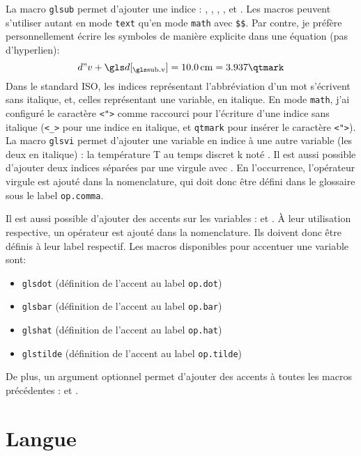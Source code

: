 \documentclass[PhD,nohyperref,english,french]{ulthese}
\begin{document}
La macro \texttt{glsub} permet d'ajouter une indice : , , , ,  et . Les macros peuvent s'utiliser autant en mode \texttt{text} qu'en mode \texttt{math} avec \texttt{\$\$}. Par contre, je préfère personnellement écrire les symboles de manière explicite dans une équation (pas d'hyperlien):
\begin{equation}
d"v + \glsub{d}{v} = \SI{10.0}{\centi\meter} = 3.937\qtmark
\end{equation}
Dans le standard ISO, les indices représentant l'abbréviation d'un mot s'écrivent sans italique, et, celles représentant une variable, en italique. En mode \texttt{math}, j'ai configuré le caractère \texttt{<">} comme raccourci pour l'écriture d'une indice sans italique (\texttt{<\_>} pour une indice en italique, et \texttt{qtmark} pour insérer le caractère \texttt{<">}). La macro \texttt{glsvi} permet d'ajouter une variable en indice à une autre variable (les deux en italique) : la température \gls{T} au temps discret \gls{k} noté . Il est aussi possible d'ajouter deux indices séparées par une virgule avec . En l’occurrence, l'opérateur virgule est ajouté dans la nomenclature, qui doit donc être défini dans le glossaire sous le label \texttt{op.comma}.

Il est aussi possible d'ajouter des accents sur les variables :  et . À leur utilisation respective, un opérateur est ajouté dans la nomenclature. Ils doivent donc être définis à leur label respectif. Les macros disponibles pour accentuer une variable sont:
\begin{itemize} 
	\item \texttt{glsdot} (définition de l'accent au label \texttt{op.dot})
	\item \texttt{glsbar} (définition de l'accent au label \texttt{op.bar})
	\item \texttt{glshat} (définition de l'accent au label \texttt{op.hat})
	\item \texttt{glstilde} (définition de l'accent au label \texttt{op.tilde})
\end{itemize}
De plus, un argument optionnel permet d'ajouter des accents à toutes les macros précédentes :  et . 

\section{Langue}
\end{document}
